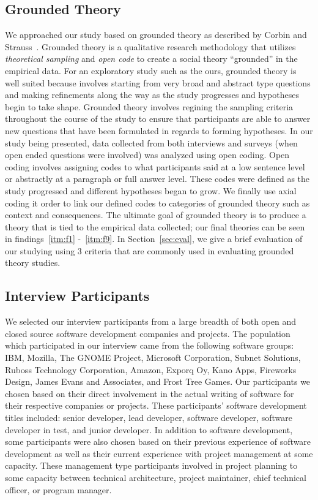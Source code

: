 \documentclass[conference]{IEEEtran}
\begin{document}
\subsection{Grounded Theory}
We approached our study based on grounded theory as described by Corbin and Strauss~\cite{Corbin:1998:SP}.
Grounded theory is a qualitative research methodology that utilizes \textit{theoretical sampling} and
\textit{open code} to create a social theory ``grounded'' in the empirical data. For an exploratory study such as
the ours, grounded theory is well suited because involves starting from very broad and abstract type questions and
making refinements along the way as the study progresses and hypotheses begin to take shape. Grounded theory involves
regining the sampling criteria throughout the course of the study to ensure that participants are able to answer new
questions that have been formulated in regards to forming hypotheses. In our study being presented, data collected from
both interviews and surveys (when open ended questions were involved) was analyzed using open coding. Open coding involves
assigning codes to what participants said at a low sentence level or abstractly at a paragraph or full answer level. These
codes were defined as the study progressed and different hypotheses began to grow. We finally use axial coding it order to
link our defined codes to categories of grounded theory such as context and consequences. The ultimate goal of grounded 
theory is to produce a theory that is tied to the empirical data collected; our final theories can be seen in
findings~\ref{itm:f1} -~\ref{itm:f9}. In Section~\ref{sec:eval}, we give a brief evaluation of our studying using 
3 criteria that are commonly used in evaluating grounded theory studies.

\subsection{Interview Participants}

We selected our interview participants from a large breadth of both open and closed source software development companies
and projects. The population which participated in our interview came from the following software groups: 
IBM, Mozilla, The GNOME Project, Microsoft Corporation, Subnet Solutions, Ruboss Technology Corporation, 
Amazon, Exporq Oy, Kano Apps, Fireworks Design, James Evans and Associates, and Frost Tree Games. 
Our participants we chosen based on their direct involvement in the actual writing of software for
their respective companies or projects. These participants' software development titles included: senior developer,
lead developer, software developer, software developer in test, and junior developer.
In addition to software development, some participants were also chosen based on their previous experience
of software development as well as their current experience with project management at some capacity. These management
type participants involved in project planning to some capacity between technical architecture, project maintainer,  
chief technical officer, or program manager.
\end{document}

